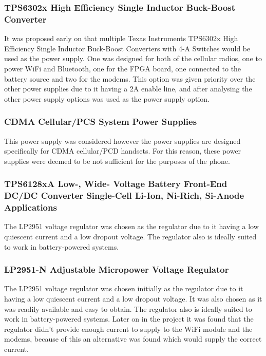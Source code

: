 \subsubsection{TPS6302x High Efficiency Single Inductor Buck-Boost Converter}

It was proposed early on that multiple Texas Instruments TPS6302x High Efficiency Single Inductor Buck-Boost Converters with 4-A Switches would be used as the power supply. One was designed for both of the cellular radios, one to power WiFi and Bluetooth, one for the FPGA board, one connected to the battery source and two for the modems. 
This option was given priority over the other power supplies due to it having a 2A enable line, and after analysing the other power supply options was used as the power supply option. 


\subsubsection{CDMA Cellular/PCS System Power Supplies}

This power supply was considered however the power supplies are designed specifically for CDMA cellular/PCD handsets. For this reason, these power supplies were deemed to be not sufficient for the purposes of the phone. 

\subsubsection{TPS6128xA Low-, Wide- Voltage Battery Front-End DC/DC Converter Single-Cell Li-Ion, Ni-Rich, Si-Anode Applications}

The LP2951 voltage regulator was chosen as the regulator due to it having a low quiescent current and a low dropout voltage. The regulator also is ideally suited to work in battery-powered systems. 

\subsubsection{LP2951-N Adjustable Micropower Voltage Regulator}

The LP2951 voltage regulator was chosen initially as the regulator due to it having a low quiescent current and a low dropout voltage. It was also chosen as it was readily available and easy to obtain. The regulator also is ideally suited to work in battery-powered systems. Later on in the project it was found that the regulator didn't provide enough current to supply to the WiFi module and the modems, because of this an alternative was found which would supply the correct current.


